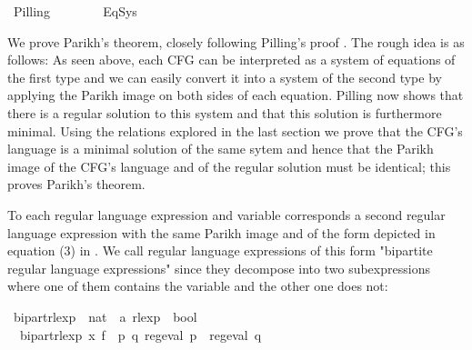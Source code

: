 %
\begin{isabellebody}%
%
%
\isadelimdocument
%
\endisadelimdocument
%
\isatagdocument
%
\isamarkuptrue%
%
\endisatagdocument
{\isafolddocument}%
%
\isadelimdocument
%
\endisadelimdocument
%
\isadelimtheory
%
\endisadelimtheory
%
\isatagtheory
{}\isamarkupfalse%
\ Pilling\isanewline
\ \ \ \isanewline
\ \ \ \ {\isachardoublequoteopen}Eq{\isacharunderscore}{\kern0pt}Sys{\isachardoublequoteclose}\isanewline
{}%
\endisatagtheory
{\isafoldtheory}%
%
\isadelimtheory
%
\endisadelimtheory
%
\begin{isamarkuptext}%
We prove Parikh's theorem, closely following Pilling's proof \cite{Pilling}. The rough
idea is as follows: As seen above, each CFG can be interpreted as a system of equations of the
first type and we can easily convert it into a system of the second type by applying the Parikh
image on both sides of each equation. Pilling now shows that there is a regular solution to this
system and that this solution is furthermore minimal.
Using the relations explored in the last section we prove that the CFG's language is a minimal
solution of the same sytem and hence that the Parikh image of the CFG's language and of the regular
solution must be identical; this proves Parikh's theorem.%
\end{isamarkuptext}\isamarkuptrue%
%
\isadelimdocument
%
\endisadelimdocument
%
\isatagdocument
%
\isamarkuptrue%
%
\endisatagdocument
{\isafolddocument}%
%
\isadelimdocument
%
\endisadelimdocument
%
\begin{isamarkuptext}%
To each regular language expression and variable  corresponds a second regular language
expression with the same Parikh image and of the form depicted in equation (3) in \cite{Pilling}.
We call regular language expressions of this form "bipartite regular language expressions" since
they decompose into two subexpressions where one of them contains the variable  and the other
one does not:%
\end{isamarkuptext}\isamarkuptrue%
\isamarkupfalse%
\ bipart{\isacharunderscore}{\kern0pt}rlexp\ {\isacharcolon}{\kern0pt}{\isacharcolon}{\kern0pt}\ {\isachardoublequoteopen}nat\ {\isasymRightarrow}\ {\isacharprime}{\kern0pt}a\ rlexp\ {\isasymRightarrow}\ bool{\isachardoublequoteclose}\ \isanewline
\ \ {\isachardoublequoteopen}bipart{\isacharunderscore}{\kern0pt}rlexp\ x\ f\ {\isasymequiv}\ {\isasymexists}p\ q{\isachardot}{\kern0pt}\ reg{\isacharunderscore}{\kern0pt}eval\ p\ {\isasymand}\ reg{\isacharunderscore}{\kern0pt}eval\ q\ {\isasymand}\isanewline

\end{isabellebody}
